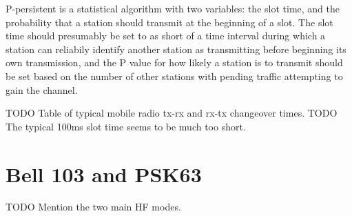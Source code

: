 P-persistent is a statistical algorithm with two variables: the slot time, and the
probability that a station should transmit at the beginning of a slot. The slot time
should presumably be set to as short of a time interval during which a station can
reliabily identify another station as transmitting before beginning its own transmission,
and the P value for how likely a station is to transmit should be set based on the 
number of other stations with pending traffic attempting to gain the channel.

TODO Table of typical mobile radio tx-rx and rx-tx changeover times.
TODO The typical 100ms slot time seems to be much too short.



\chapter{Bell 103 and PSK63}

TODO Mention the two main HF modes. 

